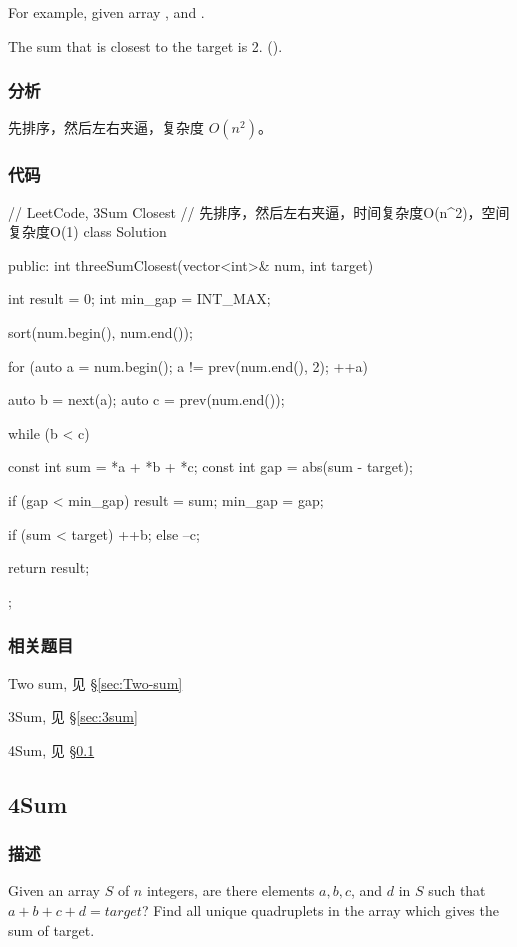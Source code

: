 For example, given array , and .

The sum that is closest to the target is 2. ().


\subsubsection{分析}
先排序，然后左右夹逼，复杂度 $O(n^2)$。


\subsubsection{代码}
\begin{Code}
// LeetCode, 3Sum Closest
// 先排序，然后左右夹逼，时间复杂度O(n^2)，空间复杂度O(1)
class Solution {
public:
    int threeSumClosest(vector<int>& num, int target) {
        int result = 0;
        int min_gap = INT_MAX;

        sort(num.begin(), num.end());

        for (auto a = num.begin(); a != prev(num.end(), 2); ++a) {
            auto b = next(a);
            auto c = prev(num.end());

            while (b < c) {
                const int sum = *a + *b + *c;
                const int gap = abs(sum - target);

                if (gap < min_gap) {
                    result = sum;
                    min_gap = gap;
                }

                if (sum < target) ++b;
                else              --c;
            }
        }

        return result;
    }
};
\end{Code}


\subsubsection{相关题目}
\begindot
\item Two sum, 见 \S \ref{sec:Two-sum}
\item 3Sum, 见 \S \ref{sec:3sum}
\item 4Sum, 见 \S \ref{sec:4sum}
\myenddot


\subsection{4Sum} %
\label{sec:4sum}


\subsubsection{描述}
Given an array $S$ of $n$ integers, are there elements $a, b, c$, and $d$ in $S$ such that $a + b + c + d = target$? Find all unique quadruplets in the array which gives the sum of target.

